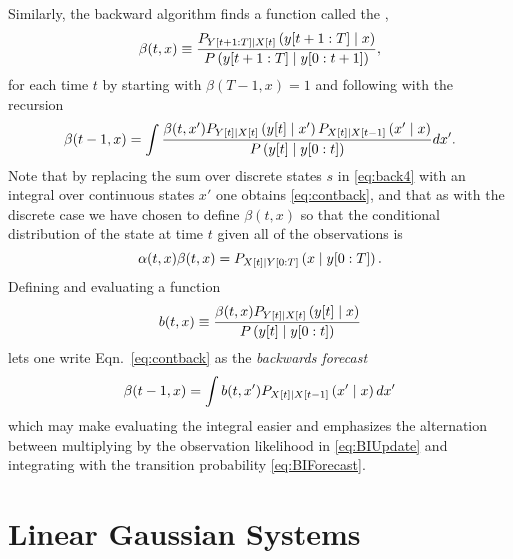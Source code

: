 Similarly, the backward algorithm finds a function called the
,
\begin{equation}
  \label{eq:contbeta}
  \beta(t,x) \equiv \frac{P_{Y[t+1:T]\mid {X}{[t]}}
  \left(y[t+1:T]\mid x \right)}{P\left(y[t+1:T]\mid y[0:t+1]
               \right)},
\end{equation}
for each time $t$ by starting with $\beta(T-1,x) = 1$ and following with
the recursion
\begin{equation}
  \label{eq:contback}
  \beta(t-1,x) = \int 
  \frac{\beta(t,x') P_{{Y}{[t]}\mid {X}{[t]}}\left({y}{[t]}\mid x' \right)
  P_{{X}{[t]}\mid {X}{[t-1]}}\left(x'\mid x \right)}
  {P\left({y}{[t]}\mid y[0:t] \right)} dx'.
\end{equation}
Note that by replacing the sum over discrete states $s$ in
\eqref{eq:back4} with an integral over continuous states $x'$ one
obtains \eqref{eq:contback}, and that as with the discrete case we
have chosen to define $\beta(t,x)$ so that the conditional
distribution of the state at time $t$ given all of the observations is
\begin{equation}
  \label{eq:contalphabeta}
  \alpha(t,x) \beta(t,x) = P_{{X}{[t]}\mid Y[0:T]}
  \left(x\mid y[0:T] \right).
\end{equation}
Defining and evaluating a \emph{} function
\begin{equation}
  \label{eq:BIUpdate}
  b(t,x) \equiv \frac{\beta(t,x)
    P_{{Y}{[t]}\mid {X}{[t]}}\left({y}{[t]}\mid x
    \right)} {P\left({y}{[t]}\mid y[0:t] \right)}
\end{equation}
lets one write Eqn.~\eqref{eq:contback} as the \emph{backwards forecast}
\begin{equation}
  \label{eq:BIForecast}
  \beta(t-1,x) = \int b(t,x') P_{{X}{[t]}\mid {X}{[t-1]}}\left(x'\mid x
  \right) dx'
\end{equation}
which may make evaluating the integral easier and emphasizes the
alternation between multiplying by the observation likelihood in
\eqref{eq:BIUpdate} and integrating with the transition probability
\eqref{eq:BIForecast}.

\section{Linear Gaussian Systems}
\label{sec:LinearGaussian}

